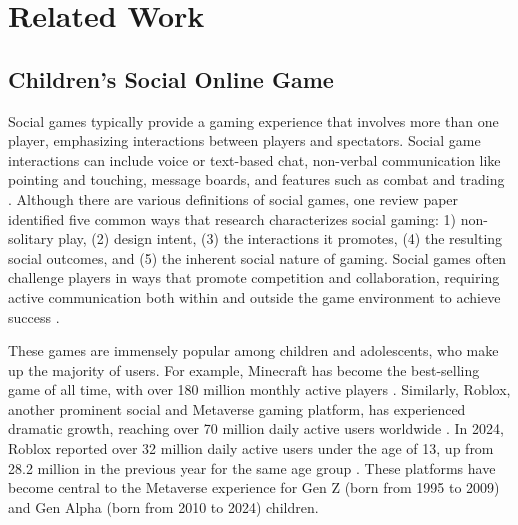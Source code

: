 \section{Related Work}
\subsection{Children's Social Online Game}
Social games typically provide a gaming experience that involves more than one player, emphasizing interactions between players and spectators. Social game interactions can include voice or text-based chat, non-verbal communication like pointing and touching, message boards, and features such as combat and trading \cite{DeKort,Emmerich,GONCALVES2023107851}. Although there are various definitions of social games, one review paper identified five common ways that research characterizes social gaming: 1) non-solitary play, (2) design intent, (3) the interactions it promotes, (4) the resulting social outcomes, and (5) the inherent social nature of gaming. Social games often challenge players in ways that promote competition and collaboration, requiring active communication both within and outside the game environment to achieve success \cite{Depping2018,depping2017cooperation,Depping2016,nardi2006strangers}.

 These games are immensely popular among children and adolescents, who make up the majority of users. For example, Minecraft has become the best-selling game of all time, with over 180 million monthly active players \cite{minecraftStates}. Similarly, Roblox, another prominent social and Metaverse gaming platform, has experienced dramatic growth, reaching over 70 million daily active users worldwide \cite{robloxStats}. In 2024, Roblox reported over 32 million daily active users under the age of 13, up from 28.2 million in the previous year for the same age group \cite{robloxStats-children}. These platforms have become central to the Metaverse experience for Gen Z (born from 1995 to 2009) and Gen Alpha (born from 2010 to 2024) children.

